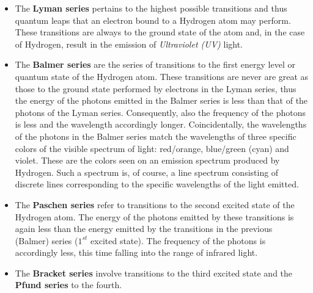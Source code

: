 \begin{itemize}
	
	\item The \textbf{Lyman series} pertains to the highest possible transitions and thus quantum leaps that an electron bound to a Hydrogen atom may perform. These transitions are always to the ground state of the atom and, in the case of Hydrogen, result in the emission of \emph{Ultraviolet (UV)} light. 

	\item The \textbf{Balmer series} are the series of transitions to the first energy level or quantum state of the Hydrogen atom. These transitions are never are great as those to the ground state performed by electrons in the Lyman series, thus the energy of the photons emitted in the Balmer series is less than that of the photons of the Lyman series. Consequently, also the frequency of the photons is less and the wavelength accordingly longer. Coincidentally, the wavelengths of the photons in the Balmer series match the wavelengths of three specific colors of the visible spectrum of light: red/orange, blue/green (cyan) and violet. These are the colors seen on an emission spectrum produced by Hydrogen. Such a spectrum is, of course, a line spectrum consisting of discrete lines corresponding to the specific wavelengths of the light emitted.

	\item The \textbf{Paschen series} refer to transitions to the second excited state of the Hydrogen atom. The energy of the photons emitted by these transitions is again less than the energy emitted by the transitions in the previous (Balmer) series ($1^{st}$ excited state). The frequency of the photons is accordingly less, this time falling into the range of infrared light.

	\item The \textbf{Bracket series} involve transitions to the third excited state and the \textbf{Pfund series} to the fourth.

\end{itemize}

